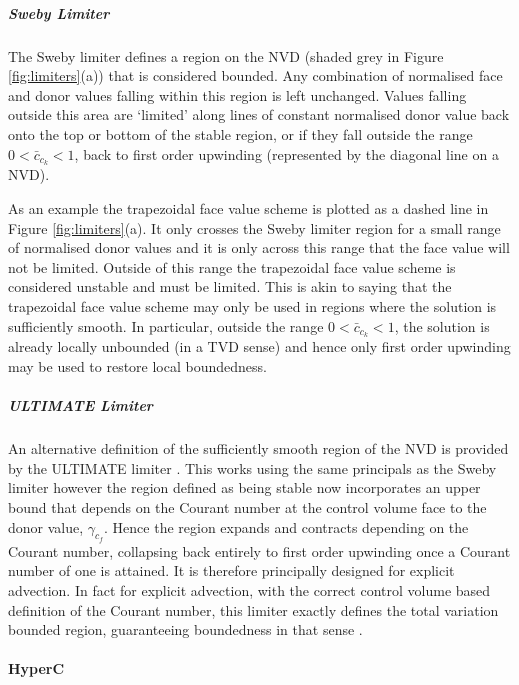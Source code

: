\subparagraph{Sweby Limiter}

The Sweby limiter \citep{sweby_high_1984} defines a region on the NVD (shaded grey in Figure \ref{fig:limiters}(a)) that is considered bounded.  Any combination of normalised face and donor values falling within this region is left unchanged.  Values falling outside this area are `limited' along lines of constant normalised donor value back onto the top or bottom of the stable region, or if they fall outside the range $0<\bar{c}_{c_k}<1$, back to first order upwinding (represented by the diagonal line on a NVD).

As an example the trapezoidal face value scheme is plotted as a dashed line in Figure \ref{fig:limiters}(a).  It only crosses the Sweby limiter region for a small range of normalised donor values and it is only across this range that the face value will not be limited.  Outside of this range the trapezoidal face value scheme is considered unstable and must be limited.  This is akin to saying that the trapezoidal face value scheme may only be used in regions where the solution is sufficiently smooth.  In particular, outside the range $0<\bar{c}_{c_k}<1$, the solution is already locally unbounded (in a TVD sense) and hence only first order upwinding may be used to restore local boundedness.

\subparagraph{ULTIMATE Limiter}

An alternative definition of the sufficiently smooth region of the NVD is provided by the ULTIMATE limiter \citep[see Figure \ref{fig:limiters}(b), ][]{leonard_ultimate_1991}.  This works using the same principals as the Sweby limiter however the region defined as being stable now incorporates an upper bound that depends on the Courant number at the control volume face to the donor value, $\gamma_{c_f}$.  Hence the region expands and contracts depending on the Courant number, collapsing back entirely to first order upwinding once a Courant number of one is attained.  It is therefore principally designed for explicit advection.  In fact for explicit advection, with the correct control volume based definition of the Courant number, this limiter exactly defines the total variation bounded region, guaranteeing boundedness in that sense \citep{leonard_ultimate_1991, desprs_contact_2001}.

\paragraph{HyperC} \label{sec:hyperc}


